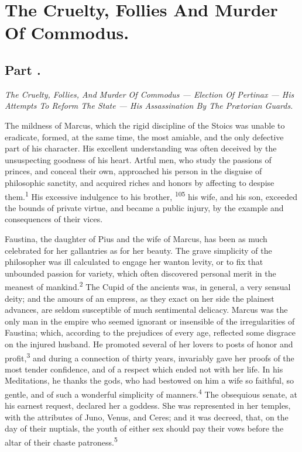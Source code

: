 \chapter{The Cruelty, Follies And Murder Of Commodus.}
\section{Part \thesection.}

\textit{The Cruelty, Follies, And Murder Of Commodus — Election Of
Pertinax — His Attempts To Reform The State — His Assassination By The
Prætorian Guards.}
\vspace{\onelineskip}

The mildness of Marcus, which the rigid discipline of the Stoics
was unable to eradicate, formed, at the same time, the most
amiable, and the only defective part of his character. His
excellent understanding was often deceived by the unsuspecting
goodness of his heart. Artful men, who study the passions of
princes, and conceal their own, approached his person in the
disguise of philosophic sanctity, and acquired riches and honors
by affecting to despise them.\textsuperscript{1} His excessive indulgence to his
brother, \textsuperscript{105} his wife, and his son, exceeded the bounds of
private virtue, and became a public injury, by the example and
consequences of their vices.



Faustina, the daughter of Pius and the wife of Marcus, has been
as much celebrated for her gallantries as for her beauty. The
grave simplicity of the philosopher was ill calculated to engage
her wanton levity, or to fix that unbounded passion for variety,
which often discovered personal merit in the meanest of mankind.\textsuperscript{2}
The Cupid of the ancients was, in general, a very sensual
deity; and the amours of an empress, as they exact on her side
the plainest advances, are seldom susceptible of much sentimental
delicacy. Marcus was the only man in the empire who seemed
ignorant or insensible of the irregularities of Faustina; which,
according to the prejudices of every age, reflected some disgrace
on the injured husband. He promoted several of her lovers to
posts of honor and profit,\textsuperscript{3} and during a connection of thirty
years, invariably gave her proofs of the most tender confidence,
and of a respect which ended not with her life. In his
Meditations, he thanks the gods, who had bestowed on him a wife
so faithful, so gentle, and of such a wonderful simplicity of
manners.\textsuperscript{4} The obsequious senate, at his earnest request,
declared her a goddess. She was represented in her temples, with
the attributes of Juno, Venus, and Ceres; and it was decreed,
that, on the day of their nuptials, the youth of either sex
should pay their vows before the altar of their chaste patroness.\textsuperscript{5}

